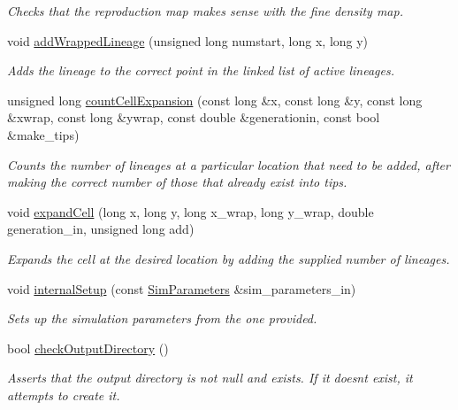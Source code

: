 \begin{DoxyCompactItemize}
\begin{DoxyCompactList}\small\item\em Checks that the reproduction map makes sense with the fine density map. \end{DoxyCompactList}\item 
void \hyperlink{class_spatial_tree_a5b26973b7f2dd3ca842a2eb8d2957896}{add\+Wrapped\+Lineage} (unsigned long numstart, long x, long y)
\begin{DoxyCompactList}\small\item\em Adds the lineage to the correct point in the linked list of active lineages. \end{DoxyCompactList}\item 
unsigned long \hyperlink{class_spatial_tree_a706ec7831f8c68e9245c00ebab76414f}{count\+Cell\+Expansion} (const long \&x, const long \&y, const long \&xwrap, const long \&ywrap, const double \&generationin, const bool \&make\+\_\+tips)
\begin{DoxyCompactList}\small\item\em Counts the number of lineages at a particular location that need to be added, after making the correct number of those that already exist into tips. \end{DoxyCompactList}\item 
void \hyperlink{class_spatial_tree_ac986898035a4c5c159cc6db19092c159}{expand\+Cell} (long x, long y, long x\+\_\+wrap, long y\+\_\+wrap, double generation\+\_\+in, unsigned long add)
\begin{DoxyCompactList}\small\item\em Expands the cell at the desired location by adding the supplied number of lineages. \end{DoxyCompactList}\item 
void \hyperlink{class_tree_a62db83e47e5850c6a83793829b22b68b}{internal\+Setup} (const \hyperlink{struct_sim_parameters}{Sim\+Parameters} \&sim\+\_\+parameters\+\_\+in)
\begin{DoxyCompactList}\small\item\em Sets up the simulation parameters from the one provided. \end{DoxyCompactList}\item 
bool \hyperlink{class_tree_a5c6065ede9862e9fb6561eb8beaf5d78}{check\+Output\+Directory} ()
\begin{DoxyCompactList}\small\item\em Asserts that the output directory is not null and exists. If it doesn\textquotesingle{}t exist, it attempts to create it. \end{DoxyCompactList}\item 

\end{DoxyCompactItemize}
